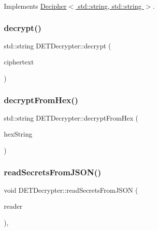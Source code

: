 Implements \hyperlink{classDecipher_ac6b8c369eda2d7e17fa90cb594cf41b6}{Decipher$<$ std\+::string, std\+::string $>$}.

\mbox{\label{classDETDecrypter_a1a0f8ebde80190b4d28ed071d139fc3a}} 
\subsubsection{\texorpdfstring{decrypt()}{decrypt()}\hspace{0.1cm}{\footnotesize\ttfamily [2/2]}}
{\footnotesize\ttfamily std\+::string D\+E\+T\+Decrypter\+::decrypt (\begin{DoxyParamCaption}\item[{Crypto\+P\+P\+::\+Sec\+Byte\+Block \&}]{ciphertext }\end{DoxyParamCaption})}

\mbox{\label{classDETDecrypter_acb1551670a0c4161a362f20c0eed0b3a}} 
\subsubsection{\texorpdfstring{decrypt\+From\+Hex()}{decryptFromHex()}}
{\footnotesize\ttfamily std\+::string D\+E\+T\+Decrypter\+::decrypt\+From\+Hex (\begin{DoxyParamCaption}\item[{std\+::string \&}]{hex\+String }\end{DoxyParamCaption})}

\mbox{\label{classDETDecrypter_a8e32703400ead9c35a80549b011307d7}} 
\subsubsection{\texorpdfstring{read\+Secrets\+From\+J\+S\+O\+N()}{readSecretsFromJSON()}}
{\footnotesize\ttfamily void D\+E\+T\+Decrypter\+::read\+Secrets\+From\+J\+S\+ON (\begin{DoxyParamCaption}\item[{std\+::string \&}]{reader }\end{DoxyParamCaption})\hspace{0.3cm}{\ttfamily [override]}, {\ttfamily [virtual]}}



